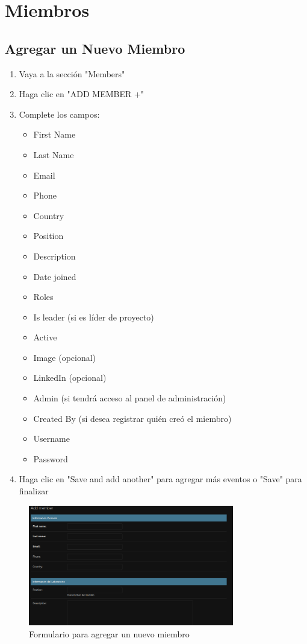 \documentclass[12pt,letterpaper]{report}
\begin{document}
\section{Miembros}
\subsection{Agregar un Nuevo Miembro}
\begin{enumerate}
    \item Vaya a la sección "Members"
    \item Haga clic en "ADD MEMBER +"
    \item Complete los campos:
        \begin{itemize}
            \item First Name
            \item Last Name
            \item Email
            \item Phone
            \item Country
            \item Position
            \item Description
            \item Date joined
            \item Roles
            \item Is leader (si es líder de proyecto)
            \item Active
            \item Image (opcional)
            \item LinkedIn (opcional)
            \item Admin (si tendrá acceso al panel de administración)
            \item Created By (si desea registrar quién creó el miembro)
            \item Username
            \item Password
        \end{itemize}
    \item Haga clic en "Save and add another" para agregar más eventos o "Save" para finalizar
\end{enumerate}

\begin{figure}[H]
    \centering
    \includegraphics[width=0.8\textwidth]{images/add_user.png}
    \caption{Formulario para agregar un nuevo miembro}
\end{figure}
\end{document}
